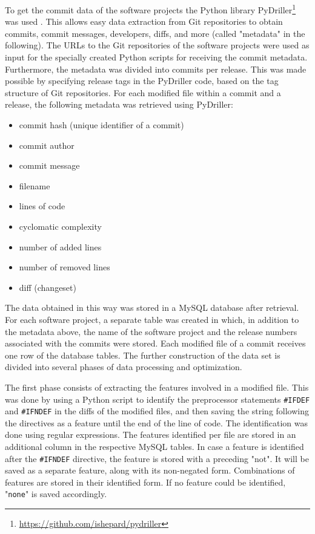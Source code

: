 To get the commit data of the software projects the Python library PyDriller\footnote{\href{https://github.com/ishepard/pydriller}{https://github.com/ishepard/pydriller}} was used \cite{Spadini2018}. This allows easy data extraction from Git repositories to obtain commits, commit messages, developers, diffs, and more (called "metadata" in the following). The URLs to the Git repositories of the software projects were used as input for the specially created Python scripts for receiving the commit metadata. Furthermore, the metadata was divided into commits per release. This was made possible by specifying release tags in the PyDriller code, based on the tag structure of Git repositories. For each modified file within a commit and a release, the following metadata was retrieved using PyDriller:

\begin{itemize}
\item commit hash (unique identifier of a commit)
\item commit author
\item commit message
\item filename
\item lines of code
\item cyclomatic complexity
\item number of added lines
\item number of removed lines
\item diff (changeset)
\end{itemize}

The data obtained in this way was stored in a MySQL database after retrieval. For each software project, a separate table was created in which, in addition to the metadata above, the name of the software project and the release numbers associated with the commits were stored. Each modified file of a commit receives one row of the database tables. The further construction of the data set is divided into several phases of data processing and optimization.

The first phase consists of extracting the features involved in a modified file. This was done by using a Python script to identify the preprocessor statements \texttt{\#IFDEF} and \texttt{\#IFNDEF} in the diffs of the modified files, and then saving the string following the directives as a feature until the end of the line of code. The identification was done using regular expressions. The features identified per file are stored in an additional column in the respective MySQL tables. In case a feature is identified after the \texttt{\#IFNDEF} directive, the feature is stored with a preceding "not". It will be saved as a separate feature, along with its non-negated form. Combinations of features are stored in their identified form. If no feature could be identified, "\texttt{none}" is saved accordingly.

